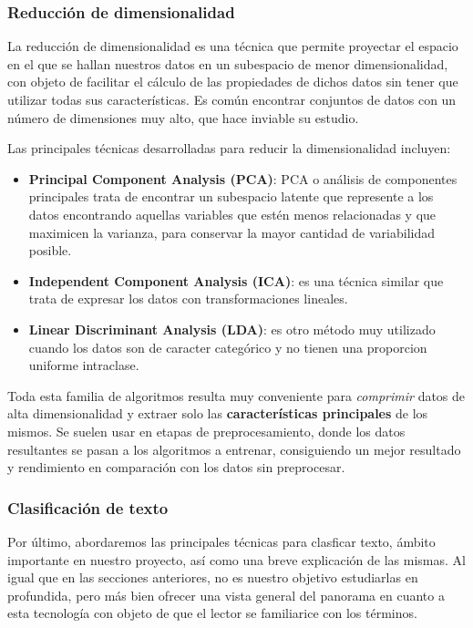 \subsubsection{Reducción de dimensionalidad}
La reducción de dimensionalidad es una técnica que permite proyectar el espacio en el que se hallan nuestros datos en un subespacio de menor dimensionalidad, con objeto de facilitar el cálculo de las propiedades de dichos datos sin tener que utilizar todas sus características. Es común encontrar conjuntos de datos con un número de dimensiones muy alto, que hace inviable su estudio.

Las principales técnicas desarrolladas para reducir la dimensionalidad incluyen:

\begin{itemize}
    \item \textbf{Principal Component Analysis (PCA)}: PCA o análisis de componentes principales trata de encontrar un subespacio latente que represente a los datos encontrando aquellas variables que estén menos relacionadas y que maximicen la varianza, para conservar la mayor cantidad de variabilidad posible. \cite{Jolliffe:1986} 
    \item \textbf{Independent Component Analysis (ICA)}: es una técnica similar que trata de expresar los datos con transformaciones lineales. \cite{Hyvrinen2014TopographicIC}
    \item \textbf{Linear Discriminant Analysis (LDA)}: es otro método muy utilizado cuando los datos son de caracter categórico y no tienen una proporcion uniforme intraclase. \cite{LDA2009}
\end{itemize}

Toda esta familia de algoritmos resulta muy conveniente para \textit{comprimir} datos de alta dimensionalidad y extraer solo las \textbf{características principales} de los mismos. Se suelen usar en etapas de preprocesamiento, donde los datos resultantes se pasan a los algoritmos a entrenar, consiguiendo un mejor resultado y rendimiento en comparación con los datos sin preprocesar.

\subsubsection{Clasificación de texto}
Por último, abordaremos las principales técnicas para clasficar texto, ámbito importante en nuestro proyecto, así como una breve explicación de las mismas. Al igual que en las secciones anteriores, no es nuestro objetivo estudiarlas en profundida, pero más bien ofrecer una vista general del panorama en cuanto a esta tecnología con objeto de que el lector se familiarice con los términos.


